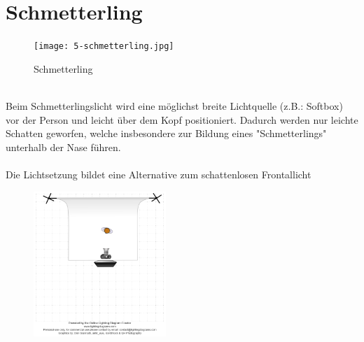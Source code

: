 \documentclass[landscape, notoc]{school}
\begin{document}
\newpage
\section{Schmetterling}
\begin{minipage}[t]{.4\textwidth}
\begin{figure}[H]
	\centering
	\texttt{[image: 5-schmetterling.jpg]}
	\caption{Schmetterling}
\end{figure}
\end{minipage}
\begin{minipage}[t]{.6\textwidth}~\\
Beim Schmetterlingslicht wird eine möglichst breite Lichtquelle (z.B.: Softbox) vor der Person und leicht über dem Kopf positioniert. Dadurch werden nur leichte Schatten geworfen, welche insbesondere zur Bildung eines "Schmetterlings" unterhalb der Nase führen.
\\\\
Die Lichtsetzung bildet eine Alternative zum schattenlosen Frontallicht
\begin{figure}[H]
	\centering
	\includegraphics[width=5cm]{5-schmetterling-diagram.png}
\end{figure}
\end{minipage}

\newpage
\end{document}
